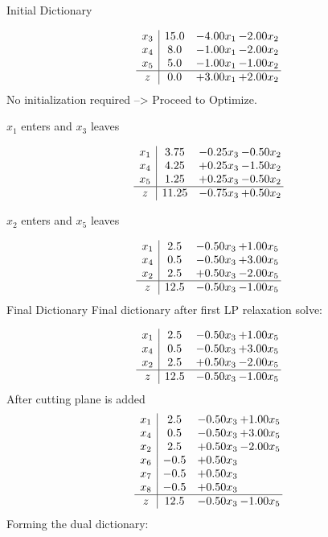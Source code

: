 \documentclass[8pt]{article}
\begin{document}
Initial Dictionary 

\[\begin{array}{c| c c@{\hskip 2pt} c@{\hskip 2pt} }
 x_{3}   &  15.0 & -4.00 x_{1} & -2.00 x_{2}\\
 x_{4}   &  8.0 & -1.00 x_{1} & -2.00 x_{2}\\
 x_{5}   &  5.0 & -1.00 x_{1} & -1.00 x_{2}\\
\hline
z    &  0.0 & +  3.00 x_{1} & +  2.00 x_{2}\\
\end{array}\]
No initialization required --> Proceed to Optimize. 


 $ x_{1} $ enters and $ x_{3} $ leaves 

 \[\begin{array}{c| c c@{\hskip 2pt} c@{\hskip 2pt} }
 x_{1}   &  3.75 & -0.25 x_{3} & -0.50 x_{2}\\
 x_{4}   &  4.25 & +  0.25 x_{3} & -1.50 x_{2}\\
 x_{5}   &  1.25 & +  0.25 x_{3} & -0.50 x_{2}\\
\hline
z    &  11.25 & -0.75 x_{3} & +  0.50 x_{2}\\
\end{array}\]


 $ x_{2} $ enters and $ x_{5} $ leaves 

 \[\begin{array}{c| c c@{\hskip 2pt} c@{\hskip 2pt} }
 x_{1}   &  2.5 & -0.50 x_{3} & +  1.00 x_{5}\\
 x_{4}   &  0.5 & -0.50 x_{3} & +  3.00 x_{5}\\
 x_{2}   &  2.5 & +  0.50 x_{3} & -2.00 x_{5}\\
\hline
z    &  12.5 & -0.50 x_{3} & -1.00 x_{5}\\
\end{array}\]
Final Dictionary
Final dictionary after first LP relaxation solve: 

\[\begin{array}{c| c c@{\hskip 2pt} c@{\hskip 2pt} }
 x_{1}   &  2.5 & -0.50 x_{3} & +  1.00 x_{5}\\
 x_{4}   &  0.5 & -0.50 x_{3} & +  3.00 x_{5}\\
 x_{2}   &  2.5 & +  0.50 x_{3} & -2.00 x_{5}\\
\hline
z    &  12.5 & -0.50 x_{3} & -1.00 x_{5}\\
\end{array}\]
 After cutting plane is added 
\[\begin{array}{c| c c@{\hskip 2pt} c@{\hskip 2pt} }
 x_{1}   &  2.5 & -0.50 x_{3} & +  1.00 x_{5}\\
 x_{4}   &  0.5 & -0.50 x_{3} & +  3.00 x_{5}\\
 x_{2}   &  2.5 & +  0.50 x_{3} & -2.00 x_{5}\\
 x_{6}   &  -0.5 & +  0.50 x_{3} &   \\
 x_{7}   &  -0.5 & +  0.50 x_{3} &   \\
 x_{8}   &  -0.5 & +  0.50 x_{3} &   \\
\hline
z    &  12.5 & -0.50 x_{3} & -1.00 x_{5}\\
\end{array}\]
Forming the dual dictionary:
\end{document}
